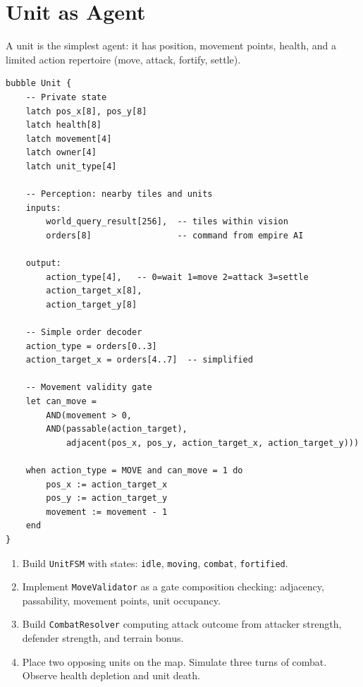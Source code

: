 \documentclass[11pt,a4paper,openany]{book}
\theoremstyle{plain}
\theoremstyle{definition}
\theoremstyle{remark}
\newenvironment{implementation}{%
  \begin{mdframed}[
    linecolor=sphereamber!80, backgroundcolor=sphereamber!5,
    linewidth=1pt, innertopmargin=8pt, innerbottommargin=8pt,
    innerleftmargin=10pt, innerrightmargin=10pt,
    skipabove=10pt, skipbelow=6pt
  ]%
  \setlength{\parindent}{0pt}%
  \noindent{\textcolor{sphereamber!80!black}{\textbf{Implementation}}}\par\smallskip\ignorespaces
}{\end{mdframed}}
\newenvironment{project}[1]{%
  \begin{tcolorbox}[
    title={\textbf{Project: #1}},
    colback=projectbg,
    colframe=sphereblue,
    fonttitle=\bfseries\color{white},
    coltitle=white,
    attach boxed title to top left={yshift=-2mm, xshift=4mm},
    boxed title style={colback=sphereblue, sharp corners},
    sharp corners,
    breakable,
    before upper={\normalfont\setlength{\parindent}{0pt}\tolerance=9999\hbadness=9999}
  ]
}{\end{tcolorbox}}
\newcommand{\Spbox}{\textsc{Spherepop}\xspace}
\newcommand{\Spbox}{\textbf{Spherepop}\xspace}
\begin{document}
\section{Unit as Agent}

A unit is the simplest agent: it has position, movement points, health,
and a limited action repertoire (move, attack, fortify, settle).

\begin{implementation}
\begin{lstlisting}[caption={Unit agent in \Spbox }]
bubble Unit {
    -- Private state
    latch pos_x[8], pos_y[8]
    latch health[8]
    latch movement[4]
    latch owner[4]
    latch unit_type[4]

    -- Perception: nearby tiles and units
    inputs:
        world_query_result[256],  -- tiles within vision
        orders[8]                 -- command from empire AI

    output:
        action_type[4],   -- 0=wait 1=move 2=attack 3=settle
        action_target_x[8],
        action_target_y[8]

    -- Simple order decoder
    action_type = orders[0..3]
    action_target_x = orders[4..7]  -- simplified

    -- Movement validity gate
    let can_move =
        AND(movement > 0,
        AND(passable(action_target),
            adjacent(pos_x, pos_y, action_target_x, action_target_y)))

    when action_type = MOVE and can_move = 1 do
        pos_x := action_target_x
        pos_y := action_target_y
        movement := movement - 1
    end
}
\end{lstlisting}
\end{implementation}

\begin{project}{Agent Machines}
  \begin{enumerate}
    \item Build \texttt{UnitFSM} with states: \texttt{idle},
          \texttt{moving}, \texttt{combat}, \texttt{fortified}.
    \item Implement \texttt{MoveValidator} as a gate composition checking:
          adjacency, passability, movement points, unit occupancy.
    \item Build \texttt{CombatResolver} computing attack outcome from
          attacker strength, defender strength, and terrain bonus.
    \item Place two opposing units on the map. Simulate three turns of
          combat. Observe health depletion and unit death.
  \end{enumerate}
\end{project}
\end{document}
